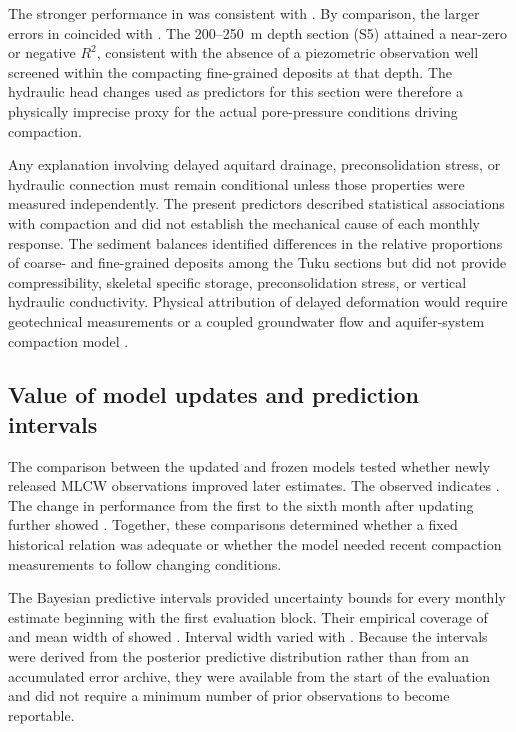The stronger performance in  was consistent with . By comparison, the larger errors in  coincided with . The 200--250~m depth section (S5) attained a near-zero or negative $R^2$, consistent with the absence of a piezometric observation well screened within the compacting fine-grained deposits at that depth. The hydraulic head changes used as predictors for this section were therefore a physically imprecise proxy for the actual pore-pressure conditions driving compaction.

Any explanation involving delayed aquitard drainage, preconsolidation stress, or hydraulic connection must remain conditional unless those properties were measured independently. The present predictors described statistical associations with compaction and did not establish the mechanical cause of each monthly response. The sediment balances identified differences in the relative proportions of coarse- and fine-grained deposits among the Tuku sections but did not provide compressibility, skeletal specific storage, preconsolidation stress, or vertical hydraulic conductivity. Physical attribution of delayed deformation would require geotechnical measurements or a coupled groundwater flow and aquifer-system compaction model \citep{galloway_land_1999, hung2012_mlcw}.

\subsection{Value of model updates and prediction intervals}
\label{subsec:discussion_updates_v2}

The comparison between the updated and frozen models tested whether newly released MLCW observations improved later estimates. The observed  indicates . The change in performance from the first to the sixth month after updating further showed . Together, these comparisons determined whether a fixed historical relation was adequate or whether the model needed recent compaction measurements to follow changing conditions.

The Bayesian predictive intervals provided uncertainty bounds for every monthly estimate beginning with the first evaluation block. Their empirical coverage of  and mean width of  showed . Interval width varied with . Because the intervals were derived from the posterior predictive distribution rather than from an accumulated error archive, they were available from the start of the evaluation and did not require a minimum number of prior observations to become reportable.

